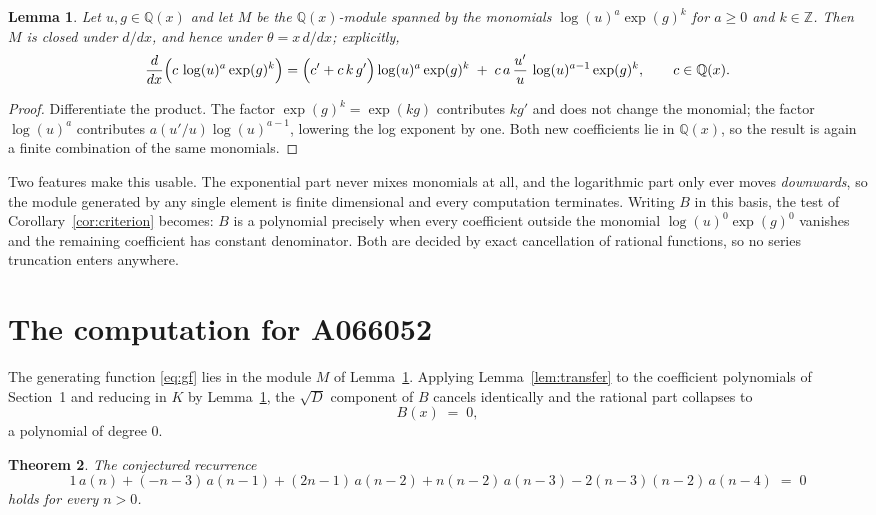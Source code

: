 \documentclass[11pt,a4paper]{article}
\theoremstyle{plain}
\newtheorem{theorem}{Theorem}
\newtheorem{lemma}[theorem]{Lemma}
\theoremstyle{definition}
\begin{document}
\begin{lemma}\label{lem:field}
Let $u,g\in\mathbb{Q}(x)$ and let $M$ be the $\mathbb{Q}(x)$-module spanned by the
monomials $\log(u)^{a}\exp(g)^{k}$ for $a\ge0$ and $k\in\mathbb{Z}$. Then $M$ is closed
under $d/dx$, and hence under $\theta=x\,d/dx$; explicitly,
\[
\frac{d}{dx}\Bigl(c\,\log(u)^{a}\exp(g)^{k}\Bigr)
=\Bigl(c'+c\,k\,g'\Bigr)\log(u)^{a}\exp(g)^{k}
\;+\;c\,a\,\frac{u'}{u}\,\log(u)^{a-1}\exp(g)^{k},
\qquad c\in\mathbb{Q}(x).
\]
\end{lemma}

\begin{proof}
Differentiate the product. The factor $\exp(g)^{k}=\exp(kg)$ contributes $kg'$ and does
not change the monomial; the factor $\log(u)^{a}$ contributes $a(u'/u)\log(u)^{a-1}$,
lowering the log exponent by one. Both new coefficients lie in $\mathbb{Q}(x)$, so the
result is again a finite combination of the same monomials.
\end{proof}

Two features make this usable. The exponential part never mixes monomials at all, and the
logarithmic part only ever moves \emph{downwards}, so the module generated by any single
element is finite dimensional and every computation terminates. Writing $B$ in this basis,
the test of Corollary~\ref{cor:criterion} becomes: $B$ is a polynomial precisely when every
coefficient outside the monomial $\log(u)^{0}\exp(g)^{0}$ vanishes and the remaining
coefficient has constant denominator. Both are decided by exact cancellation of rational
functions, so no series truncation enters anywhere.

\section{The computation for A066052}

The generating function \eqref{eq:gf} lies in the module $M$ of
Lemma~\ref{lem:field}.
Applying Lemma~\ref{lem:transfer} to the coefficient polynomials of Section~1 and reducing
in $K$ by Lemma~\ref{lem:field}, the $\sqrt{D}$ component of $B$ cancels identically and
the rational part collapses to
\[
B(x)\;=\;0 ,
\]
a polynomial of degree $0$.

\begin{theorem}
The conjectured recurrence
\[
1\,a(n) + (- n - 3)\,a(n-1) + (2 n - 1)\,a(n-2) + n \left(n - 2\right)\,a(n-3) -  2 \left(n - 3\right) \left(n - 2\right)\,a(n-4) \;=\;0
\]
holds for every $n>0$.
\end{theorem}
\end{document}
